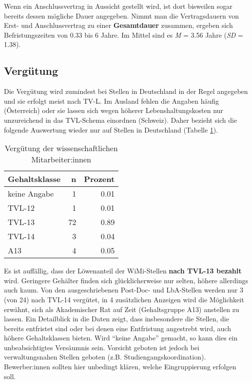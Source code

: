 \documentclass[
]{article}
\begin{document}
Wenn ein Anschlussvertrag in Aussicht gestellt wird, ist dort bisweilen sogar bereits dessen mögliche Dauer angegeben. Nimmt man die Vertragsdauern von Erst- und Anschlussvertrag zu einer \textbf{Gesamtdauer} zusammen, ergeben sich Befristungszeiten von 0.33 bis 6 Jahre. Im Mittel sind es \emph{M} = 3.56 Jahre (\emph{SD} = 1.38).

\hypertarget{verguxfctung}{%
\subsection{Vergütung}\label{verguxfctung}}

Die Vergütung wird zumindest bei Stellen in Deutschland in der Regel angegeben und sie erfolgt meist nach TV-L. Im Ausland fehlen die Angaben häufig (Österreich) oder sie lassen sich wegen höherer Lebenshaltungskosten nur unzureichend in das TVL-Schema einordnen (Schweiz). Daher bezieht sich die folgende Auswertung wieder nur auf Stellen in Deutschland (Tabelle \ref{tab:wimipay}).

\begin{table}[H]

\caption{\label{tab:wimipay}Vergütung der wissenschaftlichen Mitarbeiter:innen}
\centering
\begin{tabular}[t]{l|r|r}
\hline
Gehaltsklasse & n & Prozent\\
\hline
keine Angabe & 1 & 0.01\\
\hline
TVL-12 & 1 & 0.01\\
\hline
TVL-13 & 72 & 0.89\\
\hline
TVL-14 & 3 & 0.04\\
\hline
A13 & 4 & 0.05\\
\hline
\end{tabular}
\end{table}

Es ist auffällig, dass der Löwenanteil der WiMi-Stellen \textbf{nach TVL-13 bezahlt} wird. Geringere Gehälter finden sich glücklicherweise nur selten, höhere allerdings auch kaum. Von den ausgeschriebenen Post-Doc- und LbA-Stellen werden nur 3 (von 24) nach TVL-14 vergütet, in 4 zusätzlichen Anzeigen wird die Möglichkeit erwähnt, sich als Akademischer Rat auf Zeit (Gehaltsgruppe A13) anstellen zu lassen. Ein Detailblick in die Daten zeigt, dass insbesondere die Stellen, die bereits entfristet sind oder bei denen eine Entfristung angestrebt wird, auch höhere Gehaltsklassen bieten. Wird ``keine Angabe'' gemacht, so kann dies ein unbeabsichtigtes Versäumnis sein. Vorsicht geboten ist jedoch bei verwaltungsnahen Stellen geboten (z.B. Studiengangskoordination). Bewerber:innen sollten hier unbedingt klären, welche Eingruppierung erfolgen soll.
\end{document}

